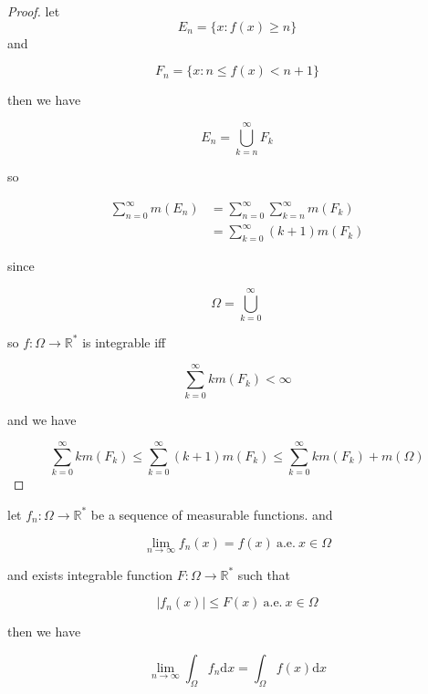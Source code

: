 \documentclass[11pt,a4paper]{article}
\begin{document}
\begin{proof}
    let
    \[
        E_n  = \{x : f(x) \ge n \}
    \]
    and

    \[
        F_n = \{x: n \le f(x) < n + 1\}
    \]

    then we have

    \[
        E_n = \bigcup_{k=n}^{\infty}F_k
    \]

    so

    \begin{align*}
        \sum_{n=0}^{\infty} m(E_n) &=  \sum_{n=0}^{\infty} \sum_{k=n}^{\infty}m(F_k) \\
        &= \sum_{k=0}^{\infty}(k+1)m(F_k)
    \end{align*}

    since 

    \[
        \Omega = \bigcup_{k=0}^{\infty}
    \]

    so $f: \Omega \to \mathbb{R}^*$ is integrable iff

    \[
        \sum_{k=0}^{\infty}k m(F_k) < \infty
    \]

    and we have

    \[
\sum_{k=0}^{\infty}k m(F_k) \le \sum_{k=0}^{\infty}(k+1) m(F_k) \le \sum_{k=0}^{\infty}k m(F_k) + m(\Omega)
    \]
\end{proof}

\begin{thm}
    let $f_n : \Omega \to \mathbb{R}^*$ be a sequence of measurable functions.
    and 

    \[
        \lim_{n \to \infty}f_n(x) = f(x) \: \text{a.e.}  \: x \in \Omega
    \]

    and exists integrable function $F: \Omega \to \mathbb{R}^*$ such that

    \[
        \left| f_n(x) \right| \le F(x) \: \text{a.e.} \: x \in \Omega
    \]

    then we have

    \[
        \lim_{n \to \infty}\int_{\Omega}f_n \mathrm{d}x = \int_{\Omega} f(x) \mathrm{d}x
    \]
\end{thm}
\end{document}
